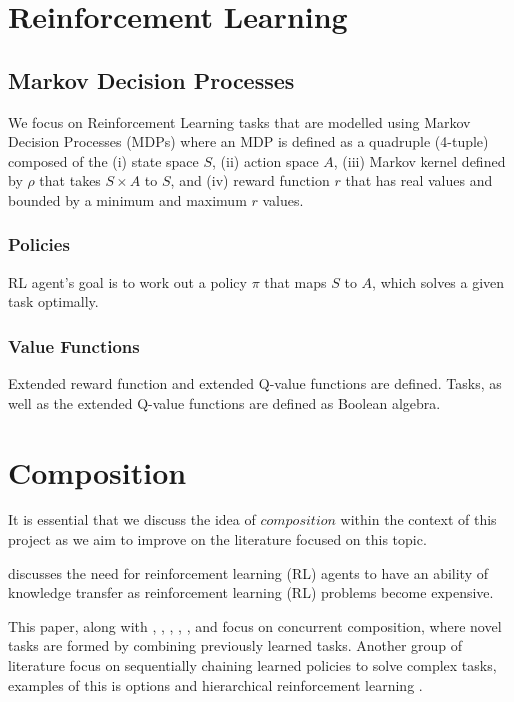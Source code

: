 \documentclass[a4paper,twoside,12pt]{report}
\begin{document}
\section{Reinforcement Learning} \label{review:rl}
\subsection{Markov Decision Processes}
We focus on Reinforcement Learning tasks that are modelled using Markov Decision Processes (MDPs) where an MDP is 
defined as a quadruple (4-tuple) composed of the (i) state space $S$, (ii) action space $A$, (iii) Markov kernel defined 
by $\rho$ that takes $S\times A$ to $S$, and (iv) reward function $r$ that has real values and bounded by a minimum and 
maximum $r$ values.

\subsubsection{Policies}
RL agent's goal is to work out a policy $\pi$ that maps $S$ to $A$, which solves a given task optimally. 

\subsubsection{Value Functions}
Extended reward function and extended Q-value functions are defined. Tasks, as well as the extended Q-value functions 
are defined as Boolean algebra.

\section{Composition} \label{review:composition}
It is essential that we discuss the idea of $composition$ \citep{todorov2009compositionality} within the context of 
this project as we aim to improve on the literature focused on this topic.

\citet{nangue2020boolean} discusses the need for reinforcement learning (RL) agents to have an ability of knowledge 
transfer as reinforcement learning (RL) problems become expensive. 

This paper, along with \citet{todorov2009compositionality}, \citet{saxe2017hierarchy}, \citet{haarnoja2018composable}, 
\citet{van2019composing}, \citet{hunt2019composing}, and \citet{peng2019mcp} focus on concurrent composition, where 
novel tasks are formed by combining previously learned tasks. Another group of literature focus on sequentially chaining 
learned policies to solve complex tasks, examples of this is options \citep{sutton1999between} and hierarchical 
reinforcement learning \citep{barto2003recent}.
\end{document}
